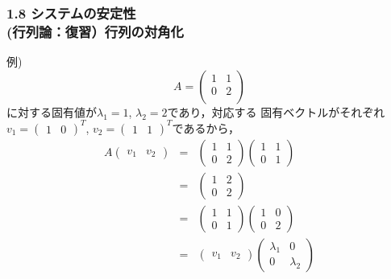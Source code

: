 \documentclass[10pt]{beamer}
\begin{document}
\begin{frame}[t]
\frametitle{1.8 システムの安定性 \\
 (行列論：復習）行列の対角化}
例)
\[
 A = \left(
      \begin{array}{cc}
       1 & 1 \\
       0 & 2 \\
      \end{array}
     \right)
\]
に対する固有値が$\lambda_1 = 1$, $\lambda_2 = 2$であり，対応する
固有ベクトルがそれぞれ$v_1 = (\begin{array}{cc}1 & 0\end{array})^T$,
$v_2 = (\begin{array}{cc}1 & 1\end{array})^T$であるから，
\begin{eqnarray}
 A
 \left(
 \begin{array}{cc}
  v_1 & v_2
 \end{array}
 \right)
 &= &
 \left(
 \begin{array}{cc}
  1 & 1 \\
  0 & 2
 \end{array}
 \right)
 \left(
 \begin{array}{cc}
  1 & 1 \\
  0 & 1
 \end{array}
 \right) \\
 &=&
 \left(
 \begin{array}{cc}
  1 & 2 \\
  0 & 2
 \end{array}
 \right) \nonumber \\
 &=&
 \left(
 \begin{array}{cc}
  1 & 1 \\
  0 & 1
 \end{array}
 \right)
 \left(
 \begin{array}{cc}
  1 & 0 \\
  0 & 2
 \end{array}
 \right) \nonumber \\
 &=&
 \left(
 \begin{array}{cc}
  v_1 & v_2
 \end{array}
 \right)
 \left(
 \begin{array}{cc}
  \lambda_1 & 0 \\
  0 & \lambda_2
 \end{array}
 \right)
\end{eqnarray}
\end{frame}
\end{document}
